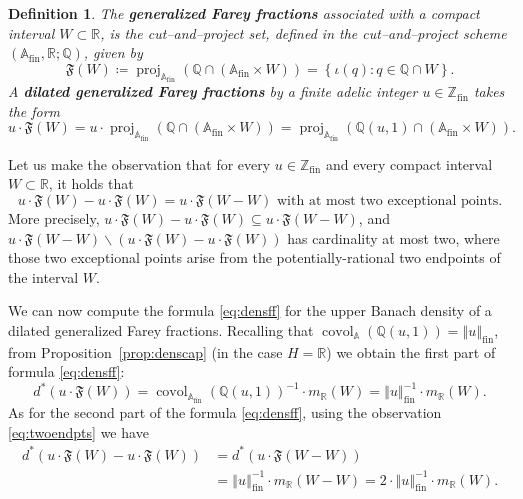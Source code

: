\documentclass{amsart}
\numberwithin{equation}{subsection}
\newtheorem{defn}[thm]{Definition}
\theoremstyle{remark}
\begin{document}
\begin{defn}
The {\bf generalized Farey fractions} associated with a compact interval \(W\subset\mathbb{R}\), is the cut--and--project set, defined in the cut--and--project scheme \(\left(\mathbb{A}_{\mathrm{fin}},\mathbb{R};\mathbb{Q}\right)\), given by
\[\mathfrak{F}\left(W\right)\coloneqq\operatorname{proj}_{\mathbb{A}_{\mathrm{fin}}}\left(\mathbb{Q}\cap\left(\mathbb{A}_{\mathrm{fin}}\times W\right)\right)=\left\{ \iota\left(q\right):q\in\mathbb{Q}\cap W\right\}.\]
A {\bf dilated generalized Farey fractions} by a finite adelic integer \(u\in\mathbb{Z}_{\mathrm{fin}}\) takes the form
\[u\cdot\mathfrak{F}\left(W\right)=u\cdot\operatorname{proj}_{\mathbb{A}_{\mathrm{fin}}}\left(\mathbb{Q}\cap\left(\mathbb{A}_{\mathrm{fin}}\times W\right)\right)=\operatorname{proj}_{\mathbb{A}_{\mathrm{fin}}}\left(\mathbb{Q}\left(u,1\right)\cap\left(\mathbb{A}_{\mathrm{fin}}\times W\right)\right).\]
\end{defn}

Let us make the observation that for every \(u\in\mathbb{Z}_{\mathrm{fin}}\) and every compact interval \(W\subset\mathbb{R}\), it holds that
\begin{equation}\label{eq:twoendpts}
u\cdot\mathfrak{F}\left(W\right)-u\cdot\mathfrak{F}\left(W\right)=u\cdot\mathfrak{F}\left(W-W\right)\text{ with at most two exceptional points}.
\end{equation}
More precisely, \(u\cdot\mathfrak{F}\left(W\right)-u\cdot\mathfrak{F}\left(W\right)\subseteq u\cdot\mathfrak{F}\left(W-W\right)\), and \(u\cdot\mathfrak{F}\left(W-W\right)\backslash\left(u\cdot\mathfrak{F}\left(W\right)-u\cdot\mathfrak{F}\left(W\right)\right)\) has cardinality at most two, where those two exceptional points arise from the potentially-rational two endpoints of the interval \(W\).

We can now compute the formula \eqref{eq:densff} for the upper Banach density of a dilated generalized Farey fractions. Recalling that \(\operatorname{covol}_{\mathbb{A}}\left(\mathbb{Q}\left(u,1\right)\right)=\left\Vert u\right\Vert_{\mathrm{fin}}\), from Proposition~\ref{prop:denscap} (in the case \(H=\mathbb{R}\)) we obtain the first part of formula \eqref{eq:densff}:
\[d^{\ast}\left(u\cdot\mathfrak{F}\left(W\right)\right)=\operatorname{covol}_{\mathbb{A}_{\mathrm{fin}}}\left(\mathbb{Q}\left(u,1\right)\right)^{-1}\cdot m_{\mathbb{R}}\left(W\right)=\left\Vert u\right\Vert _{\mathrm{fin}}^{-1}\cdot m_{\mathbb{R}}\left(W\right).\]
As for the second part of the formula \eqref{eq:densff}, using the observation \eqref{eq:twoendpts} we have
\begin{align*}
d^{\ast}\left(u\cdot\mathfrak{F}\left(W\right)-u\cdot\mathfrak{F}\left(W\right)\right)
&=d^{\ast}\left(u\cdot\mathfrak{F}\left(W-W\right)\right)\\
&=\left\Vert u\right\Vert_{\mathrm{fin}}^{-1}\cdot m_{\mathbb{R}}\left(W-W\right)=2\cdot\left\Vert u\right\Vert_{\mathrm{fin}}^{-1}\cdot m_{\mathbb{R}}\left(W\right).
\end{align*}
\end{document}
